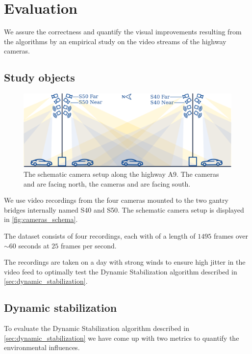 
\section{Evaluation}

We assure the correctness and quantify the visual improvements resulting from the algorithms by an empirical study on the video streams of the highway cameras.

\subsection{Study objects}
\begin{figure}[t]
    \begin{center}
       \includegraphics[width=\linewidth]{images/cameras_schema.png}
    \end{center}
       \caption{The schematic camera setup along the highway A9.
       The cameras  and  are facing north,
       the cameras  and  are facing south.}
    \label{fig:cameras_schema}
    \end{figure}

We use video recordings from the four cameras mounted to the two gantry bridges internally named S40 and S50. The schematic camera setup is displayed in \autoref{fig:cameras_schema}.

The dataset consists of four recordings, each with of a length of $1495$ frames over $\sim 60$ seconds at $25$ frames per second.

The recordings are taken on a day with strong winds to ensure high jitter in the video feed to optimally test the Dynamic Stabilization algorithm described in \autoref{sec:dynamic_stabilization}. 

\subsection{Dynamic stabilization}
\label{sec:evaluation_dynamic_stabilization}
To evaluate the Dynamic Stabilization algorithm described in \autoref{sec:dynamic_stabilization} we have come up with two metrics to quantify the environmental influences.

